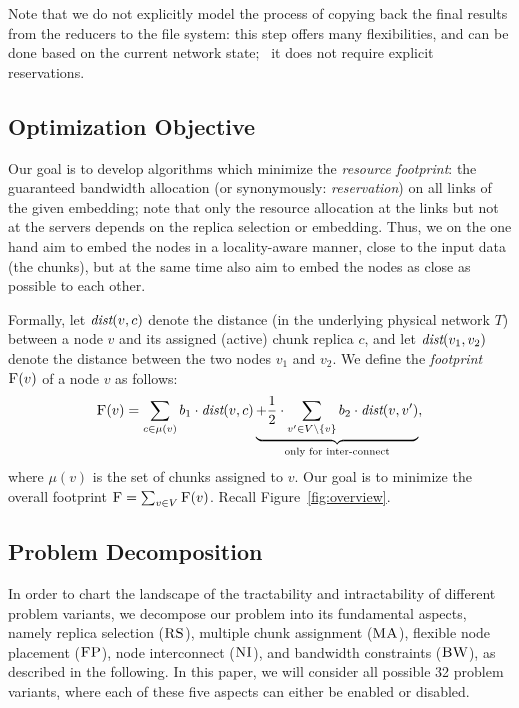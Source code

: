 \documentclass[9pt]{sigcomm-alternate}
\newcommand{\stefan}[1]{\textcolor{blue}{stefan: #1}}
\newcommand{\VirtualNodes}{\ensuremath{V}}
\newcommand{\achunk}{\ensuremath{c}}
\newcommand{\dist}{\emph{dist}}
\newcommand{\CC}{\textsc{NI}}
\newcommand{\FP}{\textsc{FP}}
\newcommand{\RS}{\textsc{RS}}
\newcommand{\BW}{\textsc{BW}}
\newcommand{\MA}{\textsc{MA}}
\newcommand{\Cost}{\textsc{F}}
\newcommand{\Tree}{\ensuremath{T}}
\newcommand{\CostTrans}{\ensuremath{b_1}}
\newcommand{\CostCom}{\ensuremath{b_2}}
\begin{document}
Note that we do not explicitly model the process of
copying back the final results from the
reducers to the file system: this step offers many flexibilities,
and can be done based on the current network state;~\cite{endpoint} it does not require
explicit reservations.



\subsection{Optimization Objective}

Our goal is to develop algorithms which minimize
the \emph{resource footprint}: the guaranteed bandwidth allocation (or synonymously: \emph{reservation}) on all links of the given embedding; note that
only the resource allocation at the links but not at the servers depends on the replica selection or embedding. Thus,
we on the one hand aim to embed the nodes in a locality-aware manner, close to the input data
(the chunks), but at the same time also aim to embed the nodes as close as possible to
each other.

Formally, let $\dist(v,\achunk)$ denote the distance (in the underlying physical network $\Tree$) between a node $v$ and
its assigned (active) chunk replica $\achunk$, and let $\dist(v_1,v_2)$ denote the distance between the two nodes $v_1$ and $v_2$.
We define the \emph{footprint} $\Cost(v)$ of a node $v$ as follows:
$$
\Cost(v) = \sum_{\achunk\in \mu(v)} \CostTrans \cdot \dist(v,\achunk) \underbrace{+ \frac{1}{2} \cdot \sum_{v' \in \VirtualNodes\setminus\{v\}} \CostCom \cdot \dist(v,v')}_{\text{only for inter-connect}},
$$
\noindent where $\mu(v)$ is the set of chunks assigned to $v$. Our goal is to minimize the overall footprint
$\Cost=\sum_{v\in V} \Cost(v)$. Recall Figure~\ref{fig:overview}.


\subsection{Problem Decomposition}

In order to chart the landscape of the tractability and intractability of different
problem variants, we decompose our problem into its fundamental aspects, namely replica selection
($\RS$), multiple chunk assignment ($\MA$), flexible node placement ($\FP$), node interconnect ($\CC$),
and bandwidth constraints ($\BW$), as described in the following.
In this paper, we will consider all possible 32 problem variants, where each of these five aspects
can either be enabled or disabled.
\end{document}
